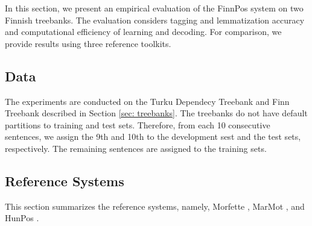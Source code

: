\documentclass[smallextended]{svjour3}       %
\begin{document}
In this section, we present an empirical evaluation of the FinnPos system on two Finnish treebanks. The evaluation considers tagging and lemmatization accuracy and computational efficiency of learning and decoding. For comparison, we provide results using three reference toolkits.

\subsection{Data}

The experiments are conducted on the Turku Dependecy Treebank \citep{haverinen2009,haverinen2013} and Finn Treebank \citep{voutilainen2011} described in Section \ref{sec: treebanks}. The treebanks do not have default partitions to training and test sets. Therefore, from each 10 consecutive sentences, we assign the 9th and 10th to the development sest and the test sets, respectively. The remaining sentences are assigned to the training sets. 

\subsection{Reference Systems}



This section summarizes the reference systems, namely, Morfette \citep{chrupala2008}, MarMot \citep{muller2013}, and HunPos \citep{halacsy2007}. 

\end{document}
